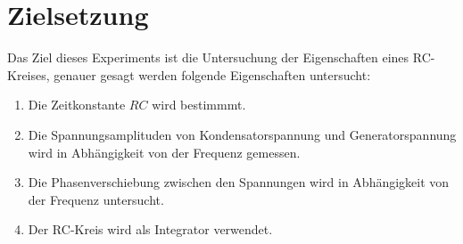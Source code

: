 \section{Zielsetzung}
\label{sec:Zielsetzung}


Das Ziel dieses Experiments ist die Untersuchung der Eigenschaften eines RC-Kreises, genauer gesagt werden folgende Eigenschaften untersucht:
\begin{enumerate}[label=\alph*)]
    \item Die Zeitkonstante $RC$ wird bestimmmt.
    \item Die Spannungsamplituden von Kondensatorspannung und Generatorspannung wird in Abhängigkeit von der Frequenz gemessen.
    \item Die Phasenverschiebung zwischen den Spannungen wird in Abhängigkeit von der Frequenz untersucht.
    \item Der RC-Kreis wird als Integrator verwendet.
\end{enumerate}